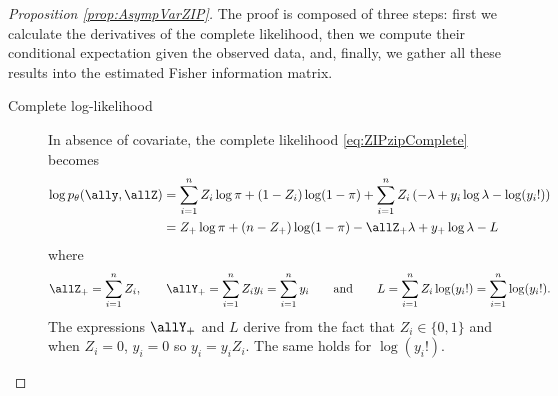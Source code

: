 \begin{proof}[Proposition \ref{prop:AsympVarZIP}]
The proof is composed of three steps: first we calculate the derivatives of the complete likelihood, then we compute their conditional expectation given the observed data, and, finally, we gather all these results into the estimated Fisher information matrix.
\begin{description}

  \item[Complete log-likelihood] In absence of covariate, the complete likelihood \eqref{eq:ZIPzipComplete}  becomes
  \begin{align*}
    \log p_\theta(\ally, \allZ) 
    & = \sum_{i=1}^n Z_i \log \pi  + (1 - Z_i) \log(1- \pi ) 
    + \sum_{i=1}^n Z_i \left(-\lambda  + y_i \log \lambda  - \log(y_i!)\right)\\
    & = Z_+ \log \pi + (n- Z_+) \log(1 - \pi) - \allZ_ +\lambda + y_+ \log \lambda - L
  \end{align*}
  where 
  $$
  \allZ_+ = \sum_{i=1}^n Z_i,  
  \qquad  \allY_+ = \sum_{i=1}^n Z_i y_i =  \sum_{i=1}^n y_i 
  \qquad \mbox{and} \qquad L = \sum_{i=1}^n Z_i \log(y_i!) = \sum_{i=1}^n  \log(y_i!).
  $$
  The expressions $\allY_+$ and $L$ derive from the fact that $Z_i\in\{0,1\}$ and when $Z_i=0$,  $y_i=0$ so $y_i = y_iZ_i$. The same holds for $\log(y_i!)$. \\
 

\end{description}
\end{proof}
